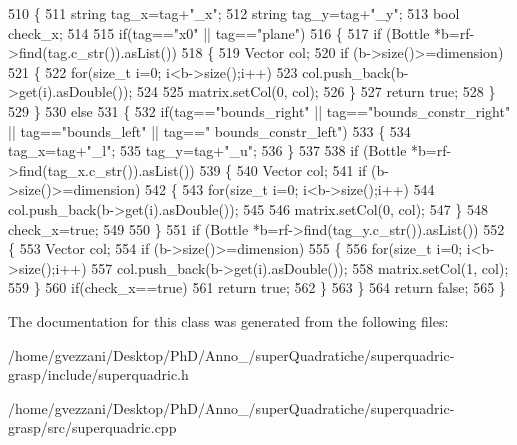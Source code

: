 \begin{DoxyCode}
510 \{
511    \textcolor{keywordtype}{string} tag\_x=tag+\textcolor{stringliteral}{"\_x"};
512    \textcolor{keywordtype}{string} tag\_y=tag+\textcolor{stringliteral}{"\_y"};
513    \textcolor{keywordtype}{bool} check\_x;
514 
515    \textcolor{keywordflow}{if}(tag==\textcolor{stringliteral}{"x0"} || tag==\textcolor{stringliteral}{"plane"})
516    \{
517        \textcolor{keywordflow}{if} (Bottle *b=rf->find(tag.c\_str()).asList())
518        \{
519            Vector col;
520            \textcolor{keywordflow}{if} (b->size()>=dimension)
521            \{
522                \textcolor{keywordflow}{for}(\textcolor{keywordtype}{size\_t} i=0; i<b->size();i++)
523                    col.push\_back(b->get(i).asDouble());
524 
525                matrix.setCol(0, col);
526            \}
527            \textcolor{keywordflow}{return} \textcolor{keyword}{true};
528        \}
529    \}
530    \textcolor{keywordflow}{else}
531    \{
532        \textcolor{keywordflow}{if}(tag==\textcolor{stringliteral}{"bounds\_right"} || tag==\textcolor{stringliteral}{"bounds\_constr\_right"} || tag==\textcolor{stringliteral}{"bounds\_left"} || tag==\textcolor{stringliteral}{"
      bounds\_constr\_left"})
533        \{
534            tag\_x=tag+\textcolor{stringliteral}{"\_l"};
535            tag\_y=tag+\textcolor{stringliteral}{"\_u"};
536        \}
537 
538        \textcolor{keywordflow}{if} (Bottle *b=rf->find(tag\_x.c\_str()).asList())
539        \{
540            Vector col;
541            \textcolor{keywordflow}{if} (b->size()>=dimension)
542            \{
543                \textcolor{keywordflow}{for}(\textcolor{keywordtype}{size\_t} i=0; i<b->size();i++)
544                    col.push\_back(b->get(i).asDouble());
545 
546                matrix.setCol(0, col);
547            \}
548            check\_x=\textcolor{keyword}{true};
549 
550        \}
551        \textcolor{keywordflow}{if} (Bottle *b=rf->find(tag\_y.c\_str()).asList())
552        \{
553            Vector col;
554            \textcolor{keywordflow}{if} (b->size()>=dimension)
555            \{
556                \textcolor{keywordflow}{for}(\textcolor{keywordtype}{size\_t} i=0; i<b->size();i++)
557                    col.push\_back(b->get(i).asDouble());
558                matrix.setCol(1, col);
559            \}
560            \textcolor{keywordflow}{if}(check\_x==\textcolor{keyword}{true})
561                \textcolor{keywordflow}{return} \textcolor{keyword}{true};
562        \}
563    \}
564 \textcolor{keywordflow}{return} \textcolor{keyword}{false};
565 \}
\end{DoxyCode}


The documentation for this class was generated from the following files\+:\begin{DoxyCompactItemize}
\item 
/home/gvezzani/\+Desktop/\+Ph\+D/\+Anno\+\_/super\+Quadratiche/superquadric-\/grasp/include/superquadric.\+h\item 
/home/gvezzani/\+Desktop/\+Ph\+D/\+Anno\+\_/super\+Quadratiche/superquadric-\/grasp/src/superquadric.\+cpp\end{DoxyCompactItemize}

